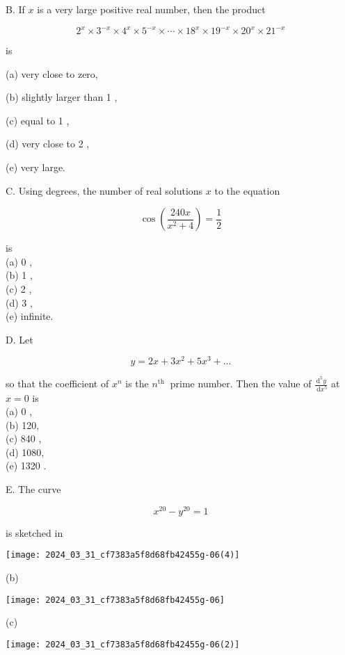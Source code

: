 \documentclass[10pt]{article}
\begin{document}
B. If $x$ is a very large positive real number, then the product

$$
2^{x} \times 3^{-x} \times 4^{x} \times 5^{-x} \times \cdots \times 18^{x} \times 19^{-x} \times 20^{x} \times 21^{-x}
$$

is

(a) very close to zero,

(b) slightly larger than 1 ,

(c) equal to 1 ,

(d) very close to 2 ,

(e) very large.

C. Using degrees, the number of real solutions $x$ to the equation

$$
\cos \left(\frac{240 x}{x^{2}+4}\right)=\frac{1}{2}
$$

is\\
(a) 0 ,\\
(b) 1 ,\\
(c) 2 ,\\
(d) 3 ,\\
(e) infinite.

D. Let

$$
y=2 x+3 x^{2}+5 x^{3}+\ldots
$$

so that the coefficient of $x^{n}$ is the $n^{\text {th }}$ prime number. Then the value of $\frac{\mathrm{d}^{5} y}{\mathrm{~d} x^{5}}$ at $x=0$ is\\
(a) 0 ,\\
(b) 120,\\
(c) 840 ,\\
(d) 1080,\\
(e) 1320 .

E. The curve

$$
x^{20}-y^{20}=1
$$

is sketched in

\begin{center}
\texttt{[image: 2024\_03\_31\_cf7383a5f8d68fb42455g-06(4)]}
\end{center}

(b)

\begin{center}
\texttt{[image: 2024\_03\_31\_cf7383a5f8d68fb42455g-06]}
\end{center}

(c)

\begin{center}
\texttt{[image: 2024\_03\_31\_cf7383a5f8d68fb42455g-06(2)]}
\end{center}
\end{document}

